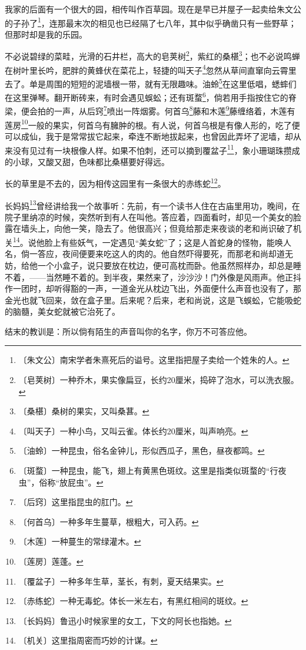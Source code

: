 \documentclass[12pt,UTF-8,openany]{ctexbook}
\begin{document}
\begin{large}
    
    我家的后面有一个很大的园，相传叫作百草园。现在是早已并屋子一起卖给朱文公的子孙了\footnote{〔朱文公〕南宋学者朱熹死后的谥号。这里指把屋子卖给一个姓朱的人。}，连那最末次的相见也已经隔了七八年，其中似乎确凿只有一些野草；但那时却是我的乐园。
    
    不必说碧绿的菜畦，光滑的石井栏，高大的皂荚树\footnote{〔皂荚树〕一种乔木，果实像扁豆，长约20厘米，捣碎了泡水，可以洗衣服。}，紫红的桑椹\footnote{〔桑椹〕桑树的果实，又叫桑葚。}；也不必说鸣蝉在树叶里长吟，肥胖的黄蜂伏在菜花上，轻捷的叫天子\footnote{〔叫天子〕一种小鸟，又叫云雀。体长约20厘米，叫声响亮。}忽然从草间直窜向云霄里去了。单是周围的短短的泥墙根一带，就有无限趣味。油蛉\footnote{〔油蛉〕一种昆虫，俗名金钟儿，形似西瓜子，黑色，昼夜都鸣。}在这里低唱，蟋蟀们在这里弹琴。翻开断砖来，有时会遇见蜈蚣；还有斑蝥\footnote{〔斑蝥〕一种昆虫，能飞，翅上有黄黑色斑纹。这里是指类似斑蝥的“行夜虫”，俗称“放屁虫”。}，倘若用手指按住它的脊梁，便会拍的一声，从后窍\footnote{〔后窍〕这里指昆虫的肛门。}喷出一阵烟雾。何首乌\footnote{〔何首乌〕一种多年生蔓草，根粗大，可入药。}藤和木莲\footnote{〔木莲〕一种蔓生的常绿灌木。}藤缠络着，木莲有莲房\footnote{〔莲房〕莲蓬。}一般的果实，何首乌有臃肿的根。有人说，何首乌根是有像人形的，吃了便可以成仙，我于是常常拔它起来，牵连不断地拔起来，也曾因此弄坏了泥墙，却从来没有见过有一块根像人样。如果不怕刺，还可以摘到覆盆子\footnote{〔覆盆子〕一种多年生草，茎长，有刺，夏天结果实。}，象小珊瑚珠攒成的小球，又酸又甜，色味都比桑椹要好得远。
    
    长的草里是不去的，因为相传这园里有一条很大的赤练蛇\footnote{〔赤练蛇〕一种无毒蛇。体长一米左右，有黑红相间的斑纹。}。
    
    长妈妈\footnote{〔长妈妈〕鲁迅小时候家里的女工，下文的阿长也指她。}曾经讲给我一个故事听：先前，有一个读书人住在古庙里用功，晚间，在院子里纳凉的时候，突然听到有人在叫他。答应着，四面看时，却见一个美女的脸露在墙头上，向他一笑，隐去了。他很高兴；但竟给那走来夜谈的老和尚识破了机关\footnote{〔机关〕这里指周密而巧妙的计谋。}。说他脸上有些妖气，一定遇见“美女蛇”了；这是人首蛇身的怪物，能唤人名，倘一答应，夜间便要来吃这人的肉的。他自然吓得要死，而那老和尚却道无妨，给他一个小盒子，说只要放在枕边，便可高枕而卧。他虽然照样办，却总是睡不着，——当然睡不着的。到半夜，果然来了，沙沙沙！门外像是风雨声。他正抖作一团时，却听得豁的一声，一道金光从枕边飞出，外面便什么声音也没有了，那金光也就飞回来，敛在盒子里。后来呢？后来，老和尚说，这是飞蜈蚣，它能吸蛇的脑髓，美女蛇就被它治死了。
    
    结末的教训是：所以倘有陌生的声音叫你的名字，你万不可答应他。
    

\end{large}
\end{document}
